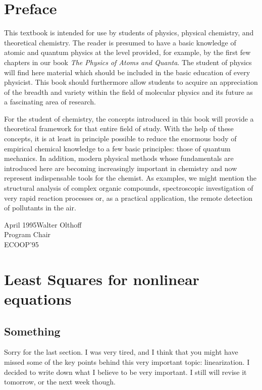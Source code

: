 \documentclass{llncs}
\begin{document}
%
\frontmatter          %
%
\pagestyle{headings}  %
%
\chapter*{Preface}
%
This textbook is intended for use by students of physics, physical
chemistry, and theoretical chemistry. The reader is presumed to have a
basic knowledge of atomic and quantum physics at the level provided, for
example, by the first few chapters in our book {\it The Physics of Atoms
and Quanta}. The student of physics will find here material which should
be included in the basic education of every physicist. This book should
furthermore allow students to acquire an appreciation of the breadth and
variety within the field of molecular physics and its future as a
fascinating area of research.

For the student of chemistry, the concepts introduced in this book will
provide a theoretical framework for that entire field of study. With the
help of these concepts, it is at least in principle possible to reduce
the enormous body of empirical chemical knowledge to a few basic
principles: those of quantum mechanics. In addition, modern physical
methods whose fundamentals are introduced here are becoming increasingly
important in chemistry and now represent indispensable tools for the
chemist. As examples, we might mention the structural analysis of
complex organic compounds, spectroscopic investigation of very rapid
reaction processes or, as a practical application, the remote detection
of pollutants in the air.

\vspace{1cm}
\begin{flushright}\noindent
April 1995\hfill Walter Olthoff\\
Program Chair\\
ECOOP'95
\end{flushright}
%

\chapter{Least Squares for nonlinear equations}

\section{Something}
Sorry for the last section. I was very tired, and I think that you might have missed some of the key points behind this very important topic: linearization. I decided to write down what I believe to be very important. I still will revise it tomorrow, or the next week though. 
\end{document}
